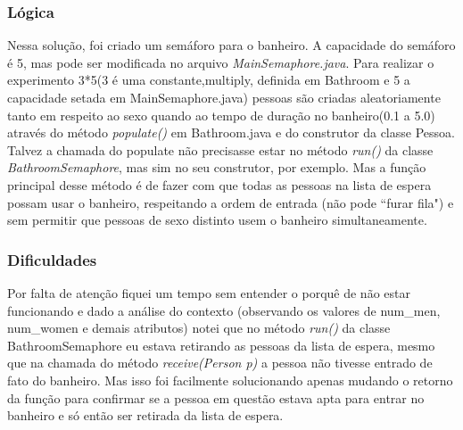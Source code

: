 \documentclass{article}
\newcommand\tab[1][1cm]{\hspace*{#1}}
\begin{document}
\subsubsection*{Lógica}
\tab Nessa solução, foi criado um semáforo para o banheiro. A capacidade do semáforo é 5, mas pode ser modificada no arquivo \textit{MainSemaphore.java}. Para realizar o experimento 3*5(3 é uma constante,multiply, definida em Bathroom e 5 a capacidade setada em MainSemaphore.java) pessoas são criadas aleatoriamente tanto em respeito ao sexo quando ao tempo de duração no banheiro(0.1 a 5.0) através do método \textit{populate()} em Bathroom.java e do construtor da classe Pessoa.\\
Talvez a chamada do populate não precisasse estar no método \textit{run()} da classe \textit{BathroomSemaphore}, mas sim no seu construtor, por exemplo. Mas a função principal desse método é de fazer com que todas as pessoas na lista de espera possam usar o banheiro, respeitando a ordem de entrada (não pode ``furar fila") e sem permitir que pessoas de sexo distinto usem o banheiro simultaneamente.

\subsubsection*{Dificuldades}
\tab Por falta de atenção fiquei um tempo sem entender o porquê de não estar funcionando e dado a análise do contexto (observando os valores de num\_men, num\_women e demais atributos) notei que no método \textit{run()} da classe BathroomSemaphore eu estava retirando as pessoas da lista de espera, mesmo que na chamada do método \textit{receive(Person p)} a pessoa não tivesse entrado de fato do banheiro. Mas isso foi facilmente solucionando apenas mudando o retorno da função para confirmar se a pessoa em questão estava apta para entrar no banheiro e só então ser retirada da lista de espera.
\end{document}
